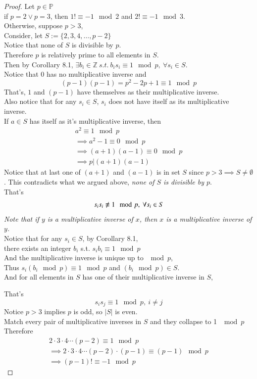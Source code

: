 \documentclass[10pt]{article}
\begin{document}
	\begin{proof}
		Let $p \in \mathbb{P}$ \\
		if $p = 2 \lor p = 3$, then $1! \equiv -1 \mod 2$ and $2! \equiv -1 \mod 3$. \\
		Otherwise, suppose $p > 3$, \\
		Consider, let $S := \{2, 3, 4, \dots, p-2\}$ \\
		Notice that none of $S$ is divisible by $p$. \\
		Therefore $p$ is relatively prime to all elements in $S$. \\
		Then by Corollary 8.1, $\exists b_i \in \mathbb{Z}\ s.t.\ b_i s_i \equiv 1 \mod p,\ \forall s_i \in S$. \\
		Notice that $0$ has no multiplicative inverse and 
		\[
			(p-1)(p-1)=p^2 - 2p + 1 \equiv 1 \mod p
		\]
		That's, $1$ and $(p-1)$ have themselves as their multiplicative inverse. \\
		Also notice that for any $s_i \in S$, $s_i$ does not have itself as its multiplicative inverse. \\
		If $a \in S$ has itself as it's multiplicative inverse, then
		\begin{gather*}
			a^2 \equiv 1 \mod p\\
			\implies a^2 - 1 \equiv 0 \mod p \\
			\implies (a+1)(a-1) \equiv 0 \mod p \\ 
			\implies p | (a+1)(a-1)
		\end{gather*}
		Notice that at last one of $(a+1)$ and $(a-1)$ is in set $S$ since $p > 3 \implies S \neq \emptyset$. This contradicts what we argued above, \emph{none of $S$ is divisible by $p$}.\\
		That's \[s_i s_i \centernot \equiv 1 \mod p,\ \forall s_i \in S\]
		\emph{Note that if $y$ is a multiplicative inverse of $x$, then $x$ is a multiplicative inverse of $y$.} \\
		Notice that for any $s_i \in S$, by Corollary 8.1, \\
		there exists an integer $b_i$ s.t. $s_i b_i \equiv 1 \mod p$\\
		And the multiplicative inverse is unique up to $\mod p$, \\
		Thus $s_i(b_i \mod p) \equiv 1 \mod p$ and $(b_i \mod p) \in S$.\\
		And for all elements in $S$ has one of their multiplicative inverse in $S$,
		
		That's
		\[
			s_i s_j \equiv 1 \mod p,\ i \neq j
		\]
		Notice $p > 3$ implies $p$ is odd, so $|S|$ is even. \\
		Match every pair of multiplicative inverses in $S$ and they collapse to 1 $\mod p$ \\
		Therefore 
		\begin{gather*}
			2\cdot 3 \cdot 4 \cdots (p-2) \equiv 1 \mod p \\
			\implies 2\cdot 3 \cdot 4 \cdots (p-2) \cdot (p-1) \equiv (p - 1) \mod p \\
			\implies (p-1)! \equiv -1 \mod p
		\end{gather*}
	\end{proof}
	
\end{document}
